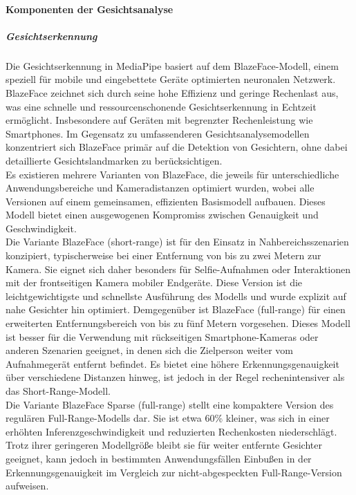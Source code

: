 \paragraph{Komponenten der Gesichtsanalyse}
\subparagraph{Gesichtserkennung}

Die Gesichtserkennung in MediaPipe basiert auf dem BlazeFace-Modell, einem speziell für mobile und eingebettete Geräte optimierten neuronalen Netzwerk. BlazeFace zeichnet sich durch seine hohe Effizienz und geringe Rechenlast aus, was eine schnelle und ressourcenschonende Gesichtserkennung in Echtzeit ermöglicht. Insbesondere auf Geräten mit begrenzter Rechenleistung wie Smartphones. Im Gegensatz zu umfassenderen Gesichtsanalysemodellen konzentriert sich BlazeFace primär auf die Detektion von Gesichtern, ohne dabei detaillierte Gesichtslandmarken zu berücksichtigen. \\
Es existieren mehrere Varianten von BlazeFace, die jeweils für unterschiedliche Anwendungsbereiche und Kameradistanzen optimiert wurden, wobei alle Versionen auf einem gemeinsamen, effizienten Basismodell aufbauen. Dieses Modell bietet einen ausgewogenen Kompromiss zwischen Genauigkeit und Geschwindigkeit. \\
Die Variante BlazeFace (short-range) ist für den Einsatz in Nahbereichsszenarien konzipiert, typischerweise bei einer Entfernung von bis zu zwei Metern zur Kamera. Sie eignet sich daher besonders für Selfie-Aufnahmen oder Interaktionen mit der frontseitigen Kamera mobiler Endgeräte. Diese Version ist die leichtgewichtigste und schnellste Ausführung des Modells und wurde explizit auf nahe Gesichter hin optimiert.
Demgegenüber ist BlazeFace (full-range) für einen erweiterten Entfernungsbereich von bis zu fünf Metern vorgesehen. Dieses Modell ist besser für die Verwendung mit rückseitigen Smartphone-Kameras oder anderen Szenarien geeignet, in denen sich die Zielperson weiter vom Aufnahmegerät entfernt befindet. Es bietet eine höhere Erkennungsgenauigkeit über verschiedene Distanzen hinweg, ist jedoch in der Regel rechenintensiver als das Short-Range-Modell. \\
Die Variante BlazeFace Sparse (full-range) stellt eine kompaktere Version des regulären Full-Range-Modells dar. Sie ist etwa 60\% kleiner, was sich in einer erhöhten Inferenzgeschwindigkeit und reduzierten Rechenkosten niederschlägt. Trotz ihrer geringeren Modellgröße bleibt sie für weiter entfernte Gesichter geeignet, kann jedoch in bestimmten Anwendungsfällen Einbußen in der Erkennungsgenauigkeit im Vergleich zur nicht-abgespeckten Full-Range-Version aufweisen. \\
